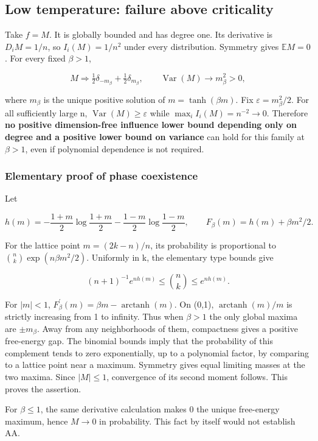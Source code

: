 \subsection{Low temperature: failure above criticality}\label{cw:low-temperature-failure-for-every-fixed-beta1}

Take \(f=M\). It is globally bounded and has degree one. Its derivative is \(D_iM=1/n\), so \(I_i(M)=1/n^2\) under every distribution. Symmetry gives \(\mathbb E M=0\). For every fixed \(\beta>1\),

\[
M\Longrightarrow\tfrac12\delta_{-m_\beta}+\tfrac12\delta_{m_\beta},\qquad
\operatorname{Var}(M)\longrightarrow m_\beta^2>0,
\]

where \(m_\beta\) is the unique positive solution of \(m=\tanh(\beta m)\). Fix \(\varepsilon=m_\beta^2/2\). For all sufficiently large n, \(\operatorname{Var}(M)\ge\varepsilon\) while \(\max_i I_i(M)=n^{-2}\to0\). Therefore \textbf{no positive dimension-free influence lower bound depending only on degree and a positive lower bound on variance} can hold for this family at \(\beta>1\), even if polynomial dependence is not required.

\subsubsection{Elementary proof of phase coexistence}\label{cw:elementary-proof-of-phase-coexistence}

Let

\[
h(m)=-\frac{1+m}{2}\log\frac{1+m}{2}-\frac{1-m}{2}\log\frac{1-m}{2},\qquad
F_\beta(m)=h(m)+\beta m^2/2.
\]

For the lattice point \(m=(2k-n)/n\), its probability is proportional to \(\binom nk\exp(n\beta m^2/2)\). Uniformly in k, the elementary type bounds give

\[
(n+1)^{-1}e^{nh(m)}\le\binom nk\le e^{nh(m)}.
\]

For \(|m|<1\), \(F_\beta^{\prime}(m)=\beta m-\operatorname{arctanh}(m)\). On (0,1), \(\operatorname{arctanh}(m)/m\) is strictly increasing from 1 to infinity. Thus when \(\beta>1\) the only global maxima are \(\pm m_\beta\). Away from any neighborhoods of them, compactness gives a positive free-energy gap. The binomial bounds imply that the probability of this complement tends to zero exponentially, up to a polynomial factor, by comparing to a lattice point near a maximum. Symmetry gives equal limiting masses at the two maxima. Since \(|M|\le1\), convergence of its second moment follows. This proves the assertion.

For \(\beta\le1\), the same derivative calculation makes 0 the unique free-energy maximum, hence \(M\to0\) in probability. This fact by itself would not establish AA.
